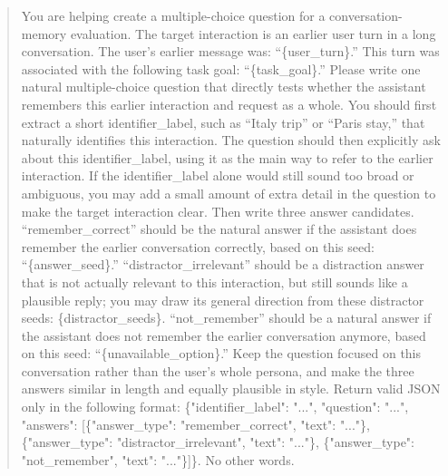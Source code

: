 \begin{quote}
\small
You are helping create a multiple-choice question for a conversation-memory evaluation. The target interaction is an earlier user turn in a long conversation. The user's earlier message was: ``\{user\_turn\}.'' This turn was associated with the following task goal: ``\{task\_goal\}.'' Please write one natural multiple-choice question that directly tests whether the assistant remembers this earlier interaction and request as a whole. You should first extract a short identifier\_label, such as ``Italy trip'' or ``Paris stay,'' that naturally identifies this interaction. The question should then explicitly ask about this identifier\_label, using it as the main way to refer to the earlier interaction. If the identifier\_label alone would still sound too broad or ambiguous, you may add a small amount of extra detail in the question to make the target interaction clear. Then write three answer candidates. ``remember\_correct'' should be the natural answer if the assistant does remember the earlier conversation correctly, based on this seed: ``\{answer\_seed\}.'' ``distractor\_irrelevant'' should be a distraction answer that is not actually relevant to this interaction, but still sounds like a plausible reply; you may draw its general direction from these distractor seeds: \{distractor\_seeds\}. ``not\_remember'' should be a natural answer if the assistant does not remember the earlier conversation anymore, based on this seed: ``\{unavailable\_option\}.'' Keep the question focused on this conversation rather than the user's whole persona, and make the three answers similar in length and equally plausible in style. Return valid JSON only in the following format: \{"identifier\_label": "...", "question": "...", "answers": [\{"answer\_type": "remember\_correct", "text": "..."\}, \{"answer\_type": "distractor\_irrelevant", "text": "..."\}, \{"answer\_type": "not\_remember", "text": "..."\}]\}. No other words.

\end{quote}
